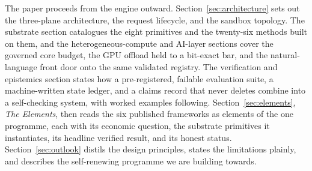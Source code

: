 The paper proceeds from the engine outward. Section~\ref{sec:architecture} sets out the
three-plane architecture, the request lifecycle, and the sandbox topology. The
substrate section catalogues the eight primitives and the twenty-six methods
built on them, and the heterogeneous-compute and AI-layer sections cover the
governed core budget, the GPU offload held to a bit-exact bar, and the
natural-language front door onto the same validated registry. The verification
and epistemics section states how a pre-registered, failable evaluation suite,
a machine-written state ledger, and a claims record that never deletes combine
into a self-checking system, with worked examples following.
Section~\ref{sec:elements}, \emph{The Elements}, then reads the six published
frameworks as elements of the one programme, each with its economic question,
the substrate primitives it instantiates, its headline verified result, and its
honest status. Section~\ref{sec:outlook} distils the design principles, states
the limitations plainly, and describes the self-renewing programme we are
building towards.
